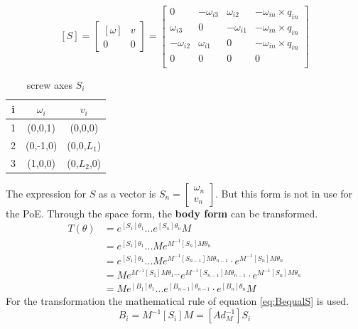 \begin{equation} \label{eq:S}
    [S] =
    \begin{bmatrix}
        [\omega] &  v \\
        0 & 0
    \end{bmatrix} 
     = 
    \begin{bmatrix}
        0 & -\omega_{i3} & \omega_{i2} & -\omega_{in} \times q_{in}\\
        \omega_{i3} & 0 & -\omega_{i1} & -\omega_{in} \times q_{in}\\
        -\omega_{i2} & \omega_{i1} & 0& -\omega_{in} \times q_{in}\\
        0 & 0 & 0 & 0\\
        \end{bmatrix}
	\end{equation}

\begin{table}[h] 
    \centering
    \begin{tabular}{c||c|c}
         i & $\omega_i$ & $v_i$\\
         \hline
         1 & (0,0,1) & (0,0,0)\\
         \hline
         2 & (0,-1,0) & (0,0,$L_1$)\\
         \hline
         3 & (1,0,0) & (0,$L_2$,0)\\
    \end{tabular}
    \caption{screw axes $S_i$}
    \label{tab:screwS}
\end{table}



The expression for $S$ as a vector is $S_n =
    \begin{bmatrix}
        \omega_n \\
        v_n
    \end{bmatrix}$. But this form is not in use for the PoE. Through the space form, the \textbf{body form} can be transformed.
\begin{align*} \label{eq1:T}
        T(\theta) &= e^{[S_1]\theta_1} ... e^{[S_n]\theta_n} M \\
                  &= e^{[S_1]\theta_1} ... M e^{M^{-1}[S_n] M \theta_n}\\
                  &= e^{[S_1]\theta_1} ... M e^{M^{-1}[S_{n-1}] M \theta_{n-1}} \cdot e^{M^{-1}[S_n] M \theta_n}\\
                  &= M e^{M^{-1}[S_{1}] M \theta_{1}...} e^{M^{-1}[S_{n-1}] M \theta_{n-1}} \cdot e^{M^{-1}[S_{n}] M \theta_{n}}\\
                  &= Me^{[B_1]\theta_1} ... e^{[B_{n-1}]\theta_{n-1}} \cdot e^{[B_n]\theta_n} M
\end{align*}
For the transformation the mathematical rule of equation \ref{eq:BequalS} is used.
\begin{equation}\label{eq:BequalS}
    B_i = M^{-1}[S_{i}] M = [Ad_M^{-1}] S_i
\end{equation}

